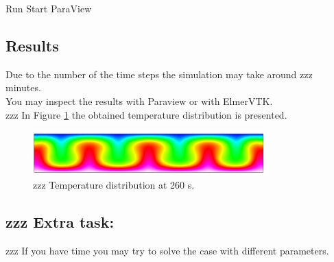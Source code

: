 \ttbegin
Run
  Start ParaView
\ttend

\subsection*{Results}

Due to the number of the time steps the simulation may take around zzz minutes.\\

You may inspect the results with Paraview or with ElmerVTK.\\

zzz In Figure \ref{fg:temp} the obtained temperature distribution is presented. 

\begin{figure}[H]
\centering
\includegraphics[width=0.8\textwidth]{temp}
\caption{zzz Temperature distribution at 260 s.}\label{fg:temp}
\end{figure} 

\subsection*{zzz Extra task:}

zzz If you have time you may try to solve the case with different parameters.

\hfill
